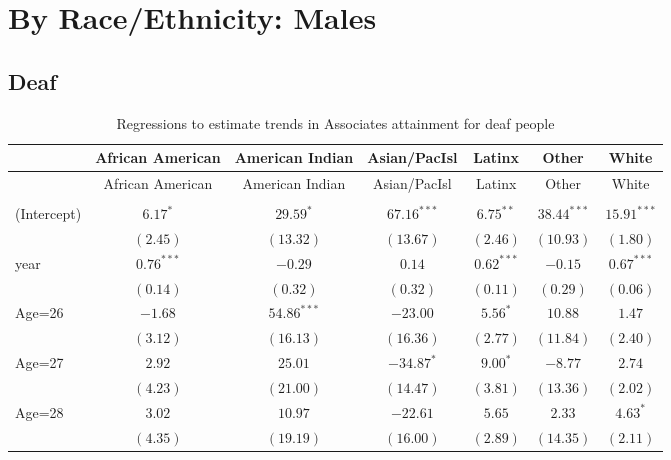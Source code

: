 \documentclass[fullpage]{paper}
\begin{document}
\section{ By Race/Ethnicity: Males }

\subsection{ Deaf }

\begin{center}
\begin{longtable}{l c c c c c c }
\hline
 & African American & American Indian & Asian/PacIsl & Latinx & Other & White \\
\hline
\endfirsthead
\hline
 & African American & American Indian & Asian/PacIsl & Latinx & Other & White \\
\hline
\endhead
\hline
\endfoot
\hline
\multicolumn{7}{l}{\scriptsize{$^{***}p<0.001$, $^{**}p<0.01$, $^*p<0.05$}}\\
\caption{Regressions to estimate trends in Associates attainment for deaf people}
\label{table:coefficients}
\endlastfoot
(Intercept) & $6.17^{*}$    & $29.59^{*}$   & $67.16^{***}$ & $6.75^{**}$   & $38.44^{***}$ & $15.91^{***}$ \\
            & $(2.45)$      & $(13.32)$     & $(13.67)$     & $(2.46)$      & $(10.93)$     & $(1.80)$      \\
year        & $0.76^{***}$  & $-0.29$       & $0.14$        & $0.62^{***}$  & $-0.15$       & $0.67^{***}$  \\
            & $(0.14)$      & $(0.32)$      & $(0.32)$      & $(0.11)$      & $(0.29)$      & $(0.06)$      \\
Age=26      & $-1.68$       & $54.86^{***}$ & $-23.00$      & $5.56^{*}$    & $10.88$       & $1.47$        \\
            & $(3.12)$      & $(16.13)$     & $(16.36)$     & $(2.77)$      & $(11.84)$     & $(2.40)$      \\
Age=27      & $2.92$        & $25.01$       & $-34.87^{*}$  & $9.00^{*}$    & $-8.77$       & $2.74$        \\
            & $(4.23)$      & $(21.00)$     & $(14.47)$     & $(3.81)$      & $(13.36)$     & $(2.02)$      \\
Age=28      & $3.02$        & $10.97$       & $-22.61$      & $5.65$        & $2.33$        & $4.63^{*}$    \\
            & $(4.35)$      & $(19.19)$     & $(16.00)$     & $(2.89)$      & $(14.35)$     & $(2.11)$      \\

\end{longtable}
\end{center}
\end{document}
